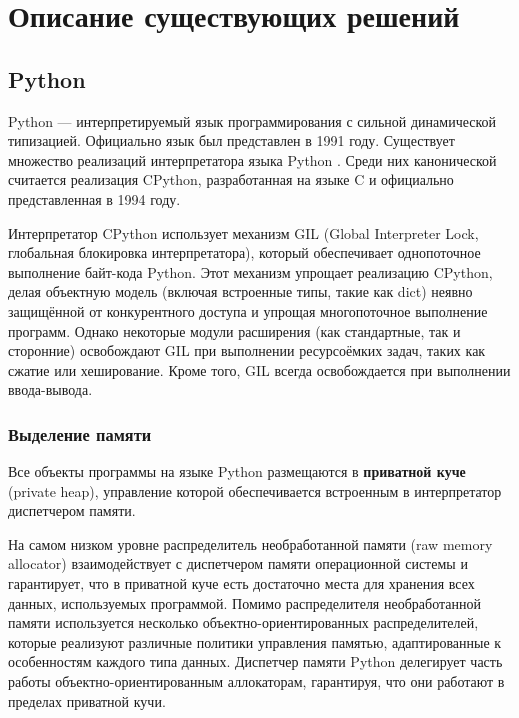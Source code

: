 \chapter{Описание существующих решений}

\section{Python}

Python \cite{python} --- интерпретируемый язык программирования с сильной динамической типизацией. Официально язык был представлен в 1991 году. Существует множество реализаций интерпретатора языка Python \cite{juthon} \cite{ironpython} \cite{pypy}. Среди них канонической считается реализация CPython, разработанная на языке C и официально представленная в 1994 году. \cite{cpython}

Интерпретатор CPython использует механизм GIL (Global Interpreter Lock, глобальная блокировка интерпретатора), который обеспечивает однопоточное выполнение байт-кода Python. Этот механизм упрощает реализацию CPython, делая объектную модель (включая встроенные типы, такие как dict) неявно защищённой от конкурентного доступа и упрощая многопоточное выполнение программ. Однако некоторые модули расширения (как стандартные, так и сторонние) \cite{python_extensions} освобождают GIL при выполнении ресурсоёмких задач, таких как сжатие или хеширование. Кроме того, GIL всегда освобождается при выполнении ввода-вывода. \cite{gil}

\subsection{Выделение памяти}

Все объекты программы на языке Python размещаются в \textbf{приватной куче} (private heap), управление которой обеспечивается встроенным в интерпретатор диспетчером памяти. \cite{python_memory}

На самом низком уровне распределитель необработанной памяти (raw memory allocator) взаимодействует с диспетчером памяти операционной системы и гарантирует, что в приватной куче есть достаточно места для хранения всех данных, используемых программой. Помимо распределителя необработанной памяти используется несколько объектно-ориентированных распределителей, которые реализуют различные политики управления памятью, адаптированные к особенностям каждого типа данных. Диспетчер памяти Python делегирует часть работы объектно-ориентированным аллокаторам, гарантируя, что они работают в пределах приватной кучи. \cite{python_memory}


